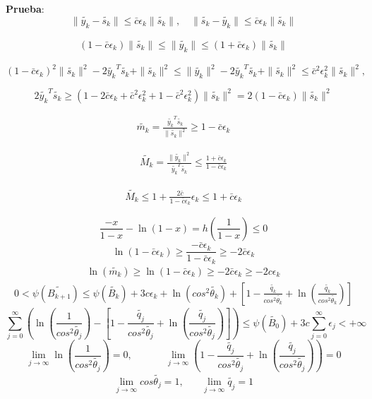 \documentclass[12pt]{article}
\newcommand{\bea}{\begin{eqnarray}}
\newcommand{\eea}{\end{eqnarray}}
\begin{document}
\textbf{Prueba}: 
\[
\| \tilde{y_{k}} -  \tilde{s_{k}} \| \leq \bar{c} \epsilon_k \| \tilde{s_{k}} \|, \quad \| \tilde{s_{k}} - \tilde{y_{k}}  \| \leq \bar{c} \epsilon_k \| \tilde{s_{k}} \|
\]

\bea  \label{6.55}
(1 - \bar{c} \epsilon_k) \| \tilde{s_{k}} \| \leq \| \tilde{y_{k}} \| \leq (1 + \bar{c} \epsilon_k) \| \tilde{s_{k}} \|
\eea

\[
  (1 - \bar{c} \epsilon_k)^2 \| \tilde{s_{k}} \|^2 - 2 \tilde{y_{k}}^T \tilde{s_{k}} + \| \tilde{s_{k}} \|^2 \leq \| \tilde{y_{k}} \|^2 - 2 \tilde{y_{k}}^T \tilde{s_{k}} +  \| \tilde{s_{k}} \|^2 \leq \bar{c}^2 \epsilon_{k}^2 \| \tilde{s_{k}} \|^2,
\]

\[
2 \tilde{y_{k}}^T \tilde{s_{k}} \geq (1 - 2 \bar{c} \epsilon_k + \bar{c}^2 \epsilon_{k}^2 + 1 - \bar{c}^2 \epsilon_{k}^2) \| \tilde{s_{k}} \|^2 = 2 (1 - \bar{c} \epsilon_k)\| \tilde{s_{k}} \|^2 
\]

\bea  \label{6.56}
\tilde{m_{k}} = \frac{\tilde{y_{k}}^T  \tilde{s_{k}}}{\| \tilde{s_{k}} \|^2 } \geq 1 - \bar{c} \epsilon_k
\eea

\bea  \label{6.57}
\tilde{M_{k}} = \frac{\| \tilde{y_{k}} \|^2 }{\tilde{y_{k}}^T  \tilde{s_{k}}} \leq \frac{1 + \bar{c} \epsilon_k}{1 - \bar{c} \epsilon_k}
\eea

\bea  \label{6.58}
\tilde{M_{k}} \leq 1 + \frac{2 \bar{c}}{1 - \bar{c} \epsilon_k} \epsilon_k \leq 1 + \bar{c} \epsilon_k
\eea

\[
\frac{-x}{1-x}-\ln(1-x)=h\left(\frac{1}{1-x}\right)\leq 0
\]
\[
\ln(1-\bar{c}\epsilon_k) \geq \frac{-\bar{c}\epsilon_k}{1-\bar{c}\epsilon_k} \geq -2\bar{c}\epsilon_k
\]
\bea \label{6.59}
\ln (\tilde{m_k}) \geq \ln(1-\bar{c}\epsilon_k) \geq -2\bar{c}\epsilon_k \geq -2c\epsilon_k
\eea
\bea \label{6.60}
0<\psi(\tilde{B_{k+1}}) \leq \psi(\tilde{B_{k}}) + 3c\epsilon_k + \ln(cos^2\tilde{\theta_k}) + \left[ 1- \frac{\tilde{q_k}}{cos^2\tilde{\theta_k}} + \ln\left(\frac{\tilde{q_k}}{cos^2\tilde{\theta_k}}\right) \right]
\eea
\[
\sum\limits_{j=0}^\infty \left(\ln\left(\frac{1}{cos^2\tilde{\theta_j}}\right) - \left[ 1- \frac{\tilde{q_j}}{cos^2\tilde{\theta_j}} + \ln\left(\frac{\tilde{q_j}}{cos^2\tilde{\theta_j}}\right) \right]\right) \leq \psi(\tilde{B_0})+3c\sum\limits_{j=0}^\infty \epsilon_j < +\infty
\]
\[
\lim_{j\to\infty} \ln\left( \frac{1}{cos^2\tilde{\theta_j}}\right)=0, \ \ \ \ \ \ \ \ \ \ \ \ \ \ \ 
\lim_{j\to\infty} \left( 1- \frac{\tilde{q_j}}{cos^2\tilde{\theta_j}} + \ln\left(\frac{\tilde{q_j}}{cos^2\tilde{\theta_j}}\right) \right) = 0
\]
\bea \label{6.61}
\lim_{j\to\infty} cos\tilde{\theta_j}=1,  \ \ \ \ \ \ \ \ 
\lim_{j\to\infty} \tilde{q_j}=1
\eea
\end{document}
